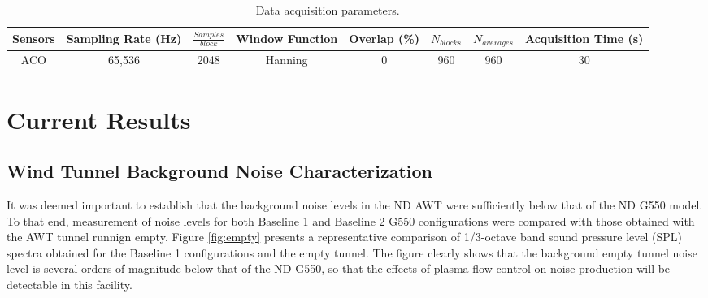 \begin{table}
 \setlength{\capwidth}{0.8\textwidth}
\begin{center}
\caption{Data acquisition parameters.}
\label{tab:data}
\begin{tabular}{cccccccc}\toprule
\parbox{0.1\linewidth}{\centering Sensors} & 
\parbox{0.12\linewidth}{\centering Sampling Rate (Hz)} & 
\parbox{0.1\linewidth}{\centering $\frac{Samples} {block}$} & 
\parbox{0.11\linewidth}{\centering Window Function} & 
\parbox{0.1\linewidth}{\centering Overlap (\%)} & 
\parbox{0.1\linewidth}{\centering $N_{blocks}$} & 
\parbox{0.1\linewidth}{\centering $N_{averages}$} & 
\parbox{0.11\linewidth}{\centering Acquisition Time (s)} \\ \midrule
ACO & 65,536 & 2048 & Hanning & 0 & 960 & 960 & 30 \\ \bottomrule
\end{tabular}
\end{center}
\end{table}

\section{Current Results}

\subsection{Wind Tunnel Background Noise Characterization}
It was deemed important to establish that the background noise levels in the ND AWT were sufficiently below that of the ND G550 model. To that end, measurement of noise levels for both Baseline 1 and Baseline 2 G550 configurations were compared with those obtained with the AWT tunnel runnign empty. Figure \ref{fig:empty} presents a representative comparison of 1/3-octave band sound pressure level (SPL) spectra obtained for the Baseline 1 configurations and the empty tunnel. The figure clearly shows that the background empty tunnel noise level is several orders of magnitude below that of the ND G550, so that the effects of plasma flow control on noise production will be detectable in this facility.


